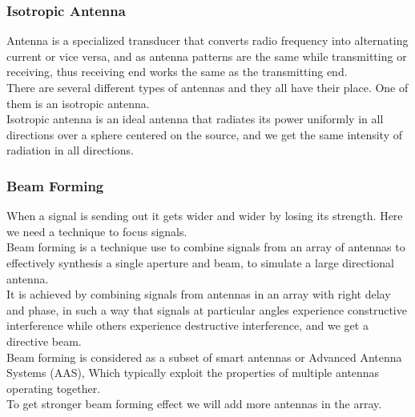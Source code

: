 \subsubsection{Isotropic Antenna}
Antenna is a specialized transducer that converts radio frequency into alternating current or vice versa, and as antenna patterns are the same while transmitting or receiving, thus receiving end works the same as the transmitting end.\\
There are several different types of antennas and they all have their place. One of them is an isotropic antenna.\\
Isotropic antenna is an ideal antenna that radiates its power uniformly in all directions over a sphere centered on the source, and we get the same intensity of radiation in all directions.

\subsubsection{Beam Forming}
When a signal is sending out it gets wider and wider by losing its strength. Here we need a technique to focus signals.\\
Beam forming is a technique use to combine signals from an array of antennas to effectively synthesis a single aperture and beam, to simulate a large directional antenna.\\
It is achieved by combining signals from antennas in an array with right delay and phase, in such a way that signals at particular angles experience constructive interference while others experience destructive interference, and we get a directive beam.\\
Beam forming is considered as a subset of smart antennas or Advanced Antenna Systems (AAS), Which typically exploit the properties of multiple antennas operating together.\\
To get stronger beam forming effect we will add more antennas in the array.

